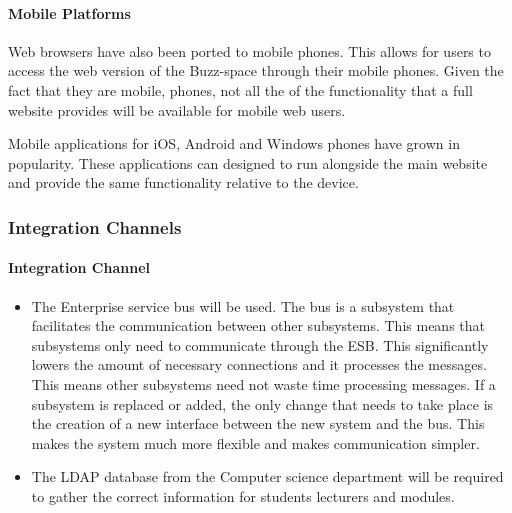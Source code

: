 \documentclass[10pt]{article}
\begin{document}
\paragraph{Mobile Platforms}
Web browsers have also been ported to mobile phones. This allows for users to access the web version of the Buzz-space through their mobile phones. Given the fact that they are mobile, phones, not all the of the functionality that a full website provides will be available for mobile web users.

Mobile applications for iOS, Android and Windows phones have grown in popularity. These applications can designed to run alongside the main website and provide the same functionality relative to the device. 


\subsubsection{Integration Channels}
\paragraph{Integration Channel}
\begin{itemize}
\item \hfill The Enterprise service bus will be used. The bus is a subsystem that facilitates the communication between other subsystems. This means that subsystems only need to communicate through the ESB. This significantly lowers the amount of necessary connections and it processes the messages. This means other subsystems need not waste time processing messages. If a subsystem is replaced or added, the only change that needs to take place is the creation of a new interface between the new system and the bus. This makes the system much more flexible and makes communication simpler. %
\item \hfill The LDAP database from the Computer science department will be required to gather the correct information for students lecturers and modules.
\end{itemize}
\end{document}
